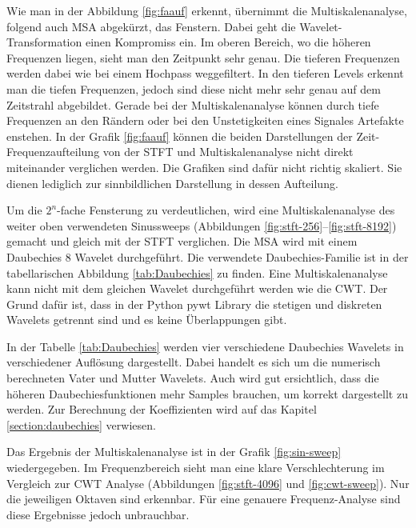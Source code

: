 Wie man in der Abbildung \ref{fig:faauf} erkennt, übernimmt die Multiskalenanalyse, folgend auch MSA abgekürzt, das Fenstern. Dabei geht die Wavelet-Transformation einen Kompromiss ein. Im oberen Bereich, wo die höheren Frequenzen liegen, sieht man den Zeitpunkt sehr genau. Die tieferen Frequenzen werden dabei wie bei einem Hochpass weggefiltert. In den tieferen Levels erkennt man die tiefen Frequenzen, jedoch sind diese nicht mehr sehr genau auf dem Zeitstrahl abgebildet. Gerade bei der Multiskalenanalyse können durch tiefe Frequenzen an den Rändern oder bei den Unstetigkeiten eines Signales Artefakte enstehen. In der Grafik \ref{fig:faauf} können die beiden Darstellungen der Zeit-Frequenzaufteilung von der STFT und Multiskalenanalyse nicht direkt miteinander verglichen werden. Die Grafiken sind dafür nicht richtig skaliert. Sie dienen lediglich zur sinnbildlichen Darstellung in dessen Aufteilung.

Um die $2^{n}$-fache Fensterung zu verdeutlichen, wird eine  Multiskalenanalyse des weiter oben verwendeten Sinussweeps (Abbildungen \ref{fig:stft-256}--\ref{fig:stft-8192}) gemacht und gleich mit der STFT verglichen.
Die MSA wird mit einem Daubechies 8 Wavelet durchgeführt. Die verwendete Daubechies-Familie ist in der tabellarischen Abbildung \ref{tab:Daubechies} zu finden. Eine Multiskalenanalyse kann nicht mit dem gleichen Wavelet durchgeführt werden wie die CWT. Der Grund dafür ist, dass in der Python pywt Library die stetigen und diskreten Wavelets getrennt sind und es keine Überlappungen gibt.

In der Tabelle \ref{tab:Daubechies} werden vier verschiedene Daubechies Wavelets in verschiedener Auflösung dargestellt. Dabei handelt es sich um die numerisch berechneten Vater und Mutter Wavelets. Auch wird gut ersichtlich, dass die höheren Daubechiesfunktionen mehr Samples brauchen, um korrekt dargestellt zu werden. Zur Berechnung der Koeffizienten wird auf das Kapitel \ref{section:daubechies} verwiesen.


Das Ergebnis der Multiskalenanalyse ist in der Grafik \ref{fig:sin-sweep} wiedergegeben. Im Frequenzbereich sieht man eine klare Verschlechterung im Vergleich zur CWT Analyse (Abbildungen \ref{fig:stft-4096} und \ref{fig:cwt-sweep}).
Nur die jeweiligen Oktaven sind erkennbar. Für eine genauere Frequenz-Analyse sind diese Ergebnisse jedoch unbrauchbar.  




